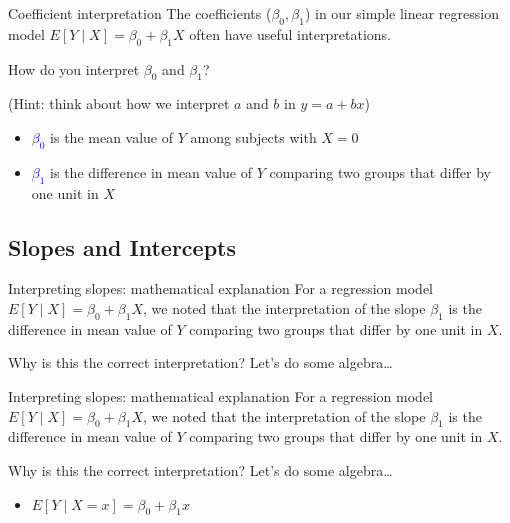 \documentclass[10pt,t]{beamer}
\begin{document}
\begin{frame}{Coefficient interpretation}
The coefficients ($\beta_0, \beta_1$) in our simple linear regression model $E[Y \mid X] = \beta_0 + \beta_1 X$ often have useful interpretations.

\vspace{0.3cm} 

How do you interpret $\beta_0$ and $\beta_1$?

\vspace{0.3cm} 

\small (Hint: think about how we interpret $a$ and $b$ in $y = a + bx$)

\normalsize 
\vspace{0.3cm} 

\begin{itemize}
	\item \textcolor{blue}{$\beta_0$} is the mean value of $Y$ among subjects with $X = 0$
	\item \textcolor{blue}{$\beta_1$} is the difference in mean value of $Y$ comparing two groups that differ by one unit in $X$
\end{itemize}

\end{frame}

\subsection{Slopes and Intercepts}

\begin{frame}{Interpreting slopes: mathematical explanation}
For a regression model $E[Y \mid X] = \beta_0 + \beta_1 X$, we noted that the interpretation of the slope $\beta_1$ is the difference in mean value of $Y$ comparing two groups that differ by one unit in $X$. 

\vspace{0.3cm}

Why is this the correct interpretation? Let's do some algebra\dots



\end{frame}

\begin{frame}{Interpreting slopes: mathematical explanation}
For a regression model $E[Y \mid X] = \beta_0 + \beta_1 X$, we noted that the interpretation of the slope $\beta_1$ is the difference in mean value of $Y$ comparing two groups that differ by one unit in $X$. 

\vspace{0.3cm}

Why is this the correct interpretation? Let's do some algebra\dots

\vspace{0.3cm}

\begin{itemize}
	\item $E[Y \mid X = x] = \beta_0 + \beta_1 x$
\end{itemize}

\end{frame}
\end{document}
